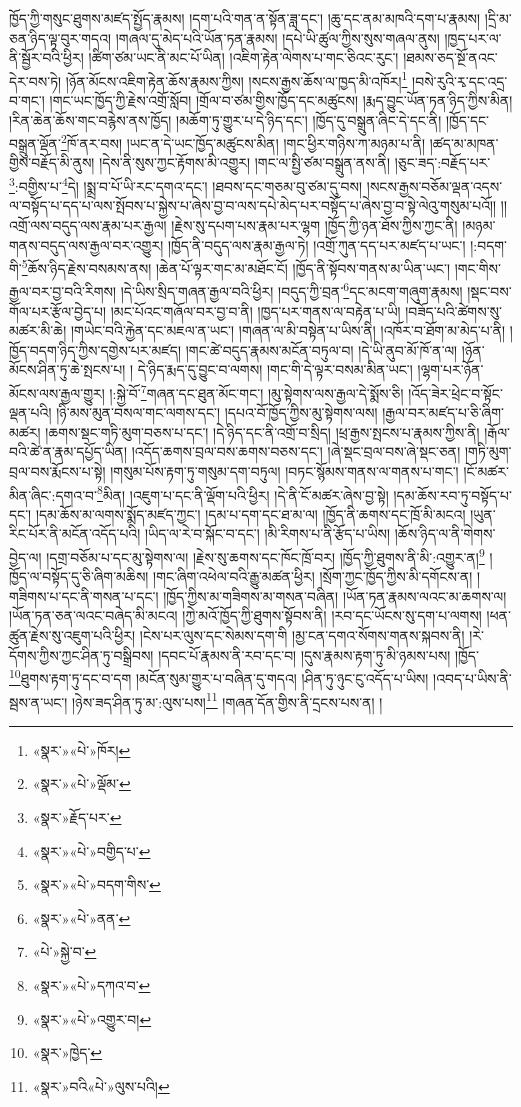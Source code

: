 ཁྱོད་ཀྱི་གསུང་ཐུགས་མཛད་སྤྱོད་རྣམས། །དག་པའི་གན་ན་སྟོན་ཟླ་དང་། །ཆུ་དང་ནམ་མཁའི་དག་པ་རྣམས། །དྲི་མ་ཅན་ཉིད་ལྟ་བུར་གདའ། །གཞལ་དུ་མེད་པའི་ཡོན་ཏན་རྣམས། །དཔེ་ཡི་ཚུལ་ཀྱིས་སུས་གཞལ་ནུས། །ཁྱད་པར་ལ་ནི་སྦྱོར་བའི་ཕྱིར། །ཚིག་ཙམ་ཡང་ནི་མང་པོ་ཡིན། །འཇིག་རྟེན་ལེགས་པ་གང་ཅིའང་རུང་། །ཐམས་ཅད་སྔོ་ནའང་དེར་བས་ཏེ། །ཉོན་མོངས་འཇིག་རྟེན་ཆོས་རྣམས་ཀྱིས། །སངས་རྒྱས་ཆོས་ལ་ཁྱད་མི་འཁོར།\footnote{«སྣར་»«པེ་»ཁོར།} །བསེ་རུའི་རྭ་དང་འདྲ་བ་གང་། །གང་ཡང་ཁྱོད་ཀྱི་རྗེས་འགྲོ་སློབ། །གྲོལ་བ་ཙམ་གྱིས་ཁྱོད་དང་མཚུངས། །རྨད་བྱུང་ཡོན་ཏན་ཉིད་ཀྱིས་མིན། །རིན་ཆེན་ཆོས་གང་བརྙེས་ནས་ཁྱོད། །མཆོག་ཏུ་གྱུར་པ་དེ་ཉིད་དང་། །ཁྱོད་དུ་བསྒྲུན་ཞིང་དེ་དང་ནི། །ཁྱོད་དང་བསྒྲུན་ལྡོན་\footnote{«སྣར་»«པེ་»ལྡོམ་}ཁོ་ནར་བས། །ཡང་ན་དེ་ཡང་ཁྱོད་མཚུངས་མིན། །གང་ཕྱིར་གཉིས་ཀ་མཉམ་པ་ནི། །ཚད་མ་མཁན་གྱིས་བརྗོད་མི་ནུས། །དེས་ནི་སུས་ཀྱང་རྟོགས་མི་འགྱུར། །གང་ལ་སྤྱི་ཙམ་བསྒྲུན་ནས་ནི། །ཅུང་ཟད་:བརྗོད་པར་\footnote{«སྣར་»རྗོད་པར་}:བགྱིས་པ་\footnote{«སྣར་»«པེ་»བགྱིད་པ་}དེ། །སྨྲ་བ་པོ་ཡི་རང་དགའ་དང་། །ཐབས་དང་གཅམ་བུ་ཙམ་དུ་བས། །སངས་རྒྱས་བཅོམ་ལྡན་འདས་ལ་བསྟོད་པ་དད་པ་ལས་སྤོབས་པ་སྐྱེས་པ་ཞེས་བྱ་བ་ལས་དཔེ་མེད་པར་བསྟོད་པ་ཞེས་བྱ་བ་སྟེ་ལེའུ་གསུམ་པའོ།། །།འགྲོ་ལས་བདུད་ལས་རྣམ་པར་རྒྱལ། །རྗེས་སུ་དཔག་པས་རྣམ་པར་ལྷག །ཁྱོད་ཀྱི་ཉན་ཐོས་ཀྱིས་ཀྱང་ནི། །མཉམ་གནས་བདུད་ལས་རྒྱལ་བར་འགྱུར། །ཁྱོད་ནི་བདུད་ལས་རྣམ་རྒྱལ་ཏེ། །འགྲོ་ཀུན་དད་པར་མཛད་པ་ཡང་། །:བདག་གི་\footnote{«སྣར་»«པེ་»བདག་གིས་}ཆོས་ཉིད་རྗེས་བསམས་ནས། །ཆེན་པོ་ལྟར་གང་མ་མཐོང་ངོ། །ཁྱོད་ནི་སྟོབས་གནས་མ་ཡིན་ཡང་། །གང་གིས་རྒྱལ་བར་བྱ་བའི་རིགས། །དེ་ཡིས་སྲིད་གཞན་རྒྱལ་བའི་ཕྱིར། །བདུད་ཀྱི་བྲན་\footnote{«སྣར་»«པེ་»ནན་}དང་མངག་གཞུག་རྣམས། །སྡང་བས་གོལ་པར་རྩོལ་བྱེད་པ། །མང་པོའང་གཞོལ་བར་བྱ་བ་ནི། །ཁྱད་པར་གནས་ལ་བརྟེན་པ་ཡི། །བཟོད་པའི་ཚེགས་སུ་མཚར་མི་ཆེ། །གཡེང་བའི་རྐྱེན་དང་མཇལ་ན་ཡང་། །གཞན་ལ་མི་བསྟེན་པ་ཡིས་ནི། །འཁོར་བ་ཐོག་མ་མེད་པ་ནི། །ཁྱོད་བདག་ཉིད་ཀྱིས་དགྱེས་པར་མཛད། །གང་ཚེ་བདུད་རྣམས་མངོན་བཏུལ་བ། །དེ་ཡི་ནུབ་མོ་ཁོ་ན་ལ། །ཉོན་མོངས་ཤིན་ཏུ་ཆེ་སྤངས་པ། །
དེ་ཉིད་རྨད་དུ་བྱུང་བ་ལགས། །གང་གི་དེ་ལྟར་བསམ་མིན་ཡང་། །ལྷག་པར་ཉོན་མོངས་ལས་རྒྱལ་གྱུར། །:སྐྱེ་བོ་\footnote{«པེ་»སྐྱེ་བ་}གཞན་དང་ཐུན་མོང་གང་། །མུ་སྟེགས་ལས་རྒྱལ་དེ་སྨོས་ཅི། །འོད་ཟེར་ཕྲེང་བ་སྟོང་ལྡན་པའི། །ཉི་མས་མུན་བསལ་གང་ལགས་དང་། །དཔའ་བོ་ཁྱོད་ཀྱིས་མུ་སྟེགས་ལས། །རྒྱལ་བར་མཛད་པ་ཅི་ཞིག་མཚར། །ཆགས་སྡང་གཏི་མུག་བཅས་པ་དང་། །དེ་ཉིད་དང་ནི་འགྲོ་བ་སྲིད། །ཕྲ་རྒྱས་སྤངས་པ་རྣམས་ཀྱིས་ནི། །རྒོལ་བའི་ཚེ་ན་རྣམ་དཔྱོད་ཡིན། །འདོད་ཆགས་བྲལ་བས་ཆགས་བཅས་དང་། །ཞེ་སྡང་བྲལ་བས་ཞེ་སྡང་ཅན། །གཏི་མུག་བྲལ་བས་རྨོངས་པ་སྟེ། །གསུམ་པོས་རྟག་ཏུ་གསུམ་དག་བཏུལ། །བཏང་སྙོམས་གནས་ལ་གནས་པ་གང་། །ངོ་མཚར་མིན་ཞིང་:དགའ་བ་\footnote{«སྣར་»«པེ་»དཀའ་བ་}མིན། །འཇུག་པ་དང་ནི་ལྡོག་པའི་ཕྱིར། །དེ་ནི་ངོ་མཚར་ཞེས་བྱ་སྟེ། །དམ་ཆོས་རབ་ཏུ་བསྟོད་པ་དང་། །དམ་ཆོས་མ་ལགས་སྨོད་མཛད་ཀྱང་། །དམ་པ་དག་དང་ཐ་མ་ལ། །ཁྱོད་ནི་ཆགས་དང་ཁྲོ་མི་མངའ། །ཡུན་རིང་པོར་ནི་མངོན་འདོད་པའི། །ཡིད་ལ་རེ་བ་སྐོང་བ་དང་། །མི་རིགས་པ་ནི་རྩོད་པ་ཡིས། །ཆོས་ཉིད་ལ་ནི་གེགས་བྱེད་ལ། །དགྲ་བཅོམ་པ་དང་མུ་སྟེགས་ལ། །རྗེས་སུ་ཆགས་དང་ཁོང་ཁྲོ་བར། །ཁྱོད་ཀྱི་ཐུགས་ནི་མི་:འགྱུར་ན།\footnote{«སྣར་»«པེ་»འགྱུར་བ།} །ཁྱོད་ལ་བསྟོད་དུ་ཅི་ཞིག་མཆིས། །གང་ཞིག་འཕེལ་བའི་རྒྱུ་མཚན་ཕྱིར། །སྲོག་ཀྱང་ཁྱོད་ཀྱིས་མི་དགོངས་ན། །གཟིགས་པ་དང་ནི་གསན་པ་དང་། །ཁྱོད་ཀྱིས་མ་གཟིགས་མ་གསན་བཞིན། །ཡོན་ཏན་རྣམས་ལའང་མ་ཆགས་ལ། །ཡོན་ཏན་ཅན་ལའང་བཞེད་མི་མངའ། །ཀྱེ་མའོ་ཁྱོད་ཀྱི་ཐུགས་སྟོབས་ནི། །རབ་དང་ཡོངས་སུ་དག་པ་ལགས། །ཕན་ཚུན་རྗེས་སུ་འཇུག་པའི་ཕྱིར། །ངེས་པར་ལུས་དང་སེམས་དག་གི །མྱ་ངན་དགའ་སོགས་གནས་སྐབས་ནི། །རེ་དོགས་ཀྱིས་ཀྱང་ཤིན་ཏུ་བསྒྲིབས། །དབང་པོ་རྣམས་ནི་རབ་དང་བ། །དུས་རྣམས་རྟག་ཏུ་མི་ཉམས་པས། །ཁྱོད་\footnote{«སྣར་»ཁྱེད་}ཐུགས་རྟག་ཏུ་དང་བ་དག །མངོན་སུམ་གྱུར་པ་བཞིན་དུ་གདའ། །ཤིན་ཏུ་ཉུང་ངུ་འདོད་པ་ཡིས། །འབད་པ་ཡིས་ནི་སྦས་ན་ཡང་། །ཉེས་ཟད་ཤིན་ཏུ་མ་:ལུས་པས།\footnote{«སྣར་»བའི«པེ་»ལུས་པའི།} །གཞན་དོན་གྱིས་ནི་དྲངས་པས་ན། །
